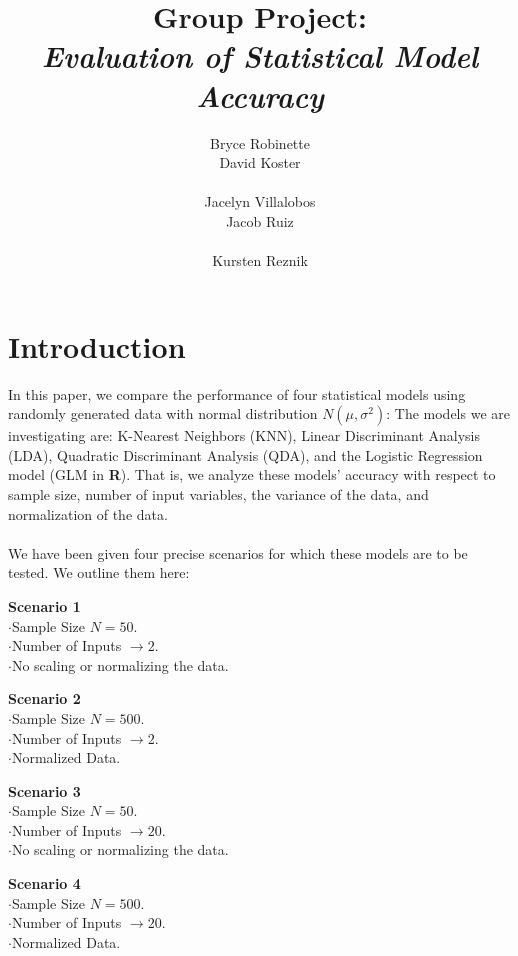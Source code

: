 \documentclass[11pt, oneside]{article}
\title{Group Project:\\
\emph{Evaluation of Statistical Model Accuracy}
}
\author{\hspace{0.0cm}\parbox[t][2.5cm][t]{4cm}{
	Bryce Robinette\\
	David Koster\\
}
\parbox[t][2.5cm][t]{4cm}{
	Jacelyn Villalobos\\
	Jacob Ruiz\\
}
Kursten Reznik 
}
\date{}
\begin{document}
\maketitle




\section*{Introduction}
In this paper, we compare the performance of four statistical models using randomly generated data with normal distribution $N(\mu, \sigma^2)$: The models we are investigating are: K-Nearest Neighbors (KNN), Linear Discriminant Analysis (LDA), Quadratic Discriminant Analysis (QDA), and the Logistic Regression model (GLM in \textbf\textsf{R}). That is, we analyze these models' accuracy with respect to sample size, number of input variables, the variance of the data, and normalization of the data.\\
\\
We have been given four precise scenarios for which these models are to be tested. We outline them here:\\


\hspace{1.5cm}\parbox[t][2.5cm][t]{8cm}{
	\textbf{Scenario 1}\\
	$\cdot$Sample Size $N = 50.$\\
	$\cdot$Number of Inputs $\rightarrow 2$.\\
	$\cdot$No scaling or normalizing the data.
}
\parbox[t][2.5cm][t]{8cm}{
	\textbf{Scenario 2}\\
	$\cdot$Sample Size $N = 500.$\\
	$\cdot$Number of Inputs $\rightarrow 2$.\\
	$\cdot$Normalized Data.
}

\hspace{1.5cm}\parbox[t][2.5cm][t]{8cm}{
	\textbf{Scenario 3}\\
	$\cdot$Sample Size $N = 50.$\\
	$\cdot$Number of Inputs $\rightarrow 20$.\\
	$\cdot$No scaling or normalizing the data.
}
\parbox[t][2.5cm][t]{8cm}{
	\textbf{Scenario 4}\\
	$\cdot$Sample Size $N = 500.$\\
	$\cdot$Number of Inputs $\rightarrow 20$.\\
	$\cdot$Normalized Data.
}
\end{document}
